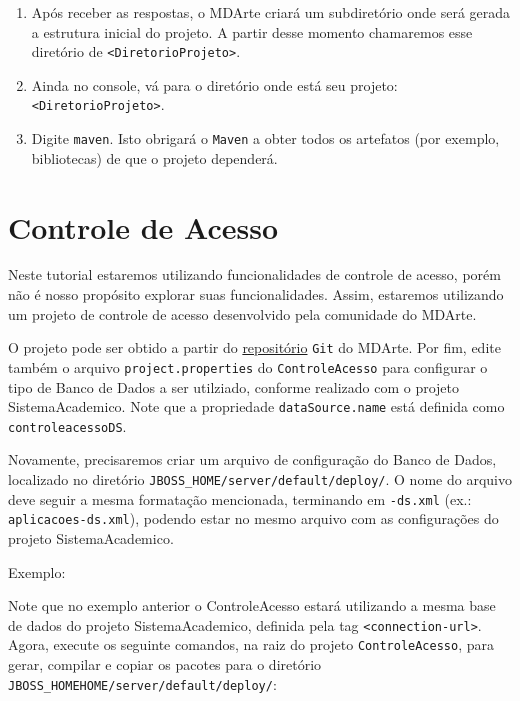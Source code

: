 \begin{enumerate}
\item Após receber as respostas, o MDArte criará um subdiretório onde será
gerada a estrutura inicial do projeto. A partir desse momento chamaremos esse
diretório de \texttt{<DiretorioProjeto>}.

\item Ainda no console, vá para o diretório onde está seu projeto:
\texttt{<DiretorioProjeto>}.

\item Digite \texttt{maven}. Isto obrigará o \texttt{Maven} a obter todos os
artefatos (por exemplo, bibliotecas) de que o projeto dependerá.

\end{enumerate}

\section{Controle de Acesso}

Neste tutorial estaremos utilizando funcionalidades de controle de acesso, porém
não é nosso propósito explorar suas funcionalidades. Assim, estaremos utilizando
um projeto de controle de acesso desenvolvido pela comunidade do MDArte.

O projeto pode ser obtido a partir do
\href{https://github.com/MDArte/controleacesso.git}{repositório} \texttt{Git} do
MDArte. Por fim, edite também o arquivo \texttt{project.properties} do
\texttt{ControleAcesso} para configurar o tipo de Banco de Dados a ser
utilziado, conforme realizado com o projeto SistemaAcademico. Note que a
propriedade \texttt{dataSource.name} está definida como
\texttt{controleacessoDS}.

Novamente, precisaremos criar um arquivo de configuração do Banco de Dados,
localizado no diretório
\texttt{\textdollar{}JBOSS\_HOME/server/default/deploy/}. O nome do arquivo deve
seguir a mesma formatação mencionada, terminando em \texttt{-ds.xml} (ex.:
\texttt{aplicacoes-ds.xml}), podendo estar no mesmo arquivo com as configurações
do projeto SistemaAcademico.

Exemplo:

\begin{framed}
	
\end{framed}

Note que no exemplo anterior o ControleAcesso estará utilizando a mesma base de
dados do projeto SistemaAcademico, definida pela tag \texttt{<connection-url>}.
Agora, execute os seguinte comandos, na raiz do projeto \texttt{ControleAcesso},
para gerar, compilar e copiar os pacotes para o diretório
\texttt{\textdollar{}JBOSS\_HOMEHOME/server/default/deploy/}:

